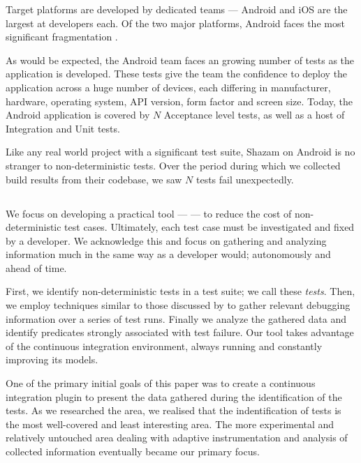 Target platforms are developed by dedicated teams --- Android and iOS are the largest at  developers each. Of the two major platforms, Android faces the most significant fragmentation \cite{AndroidFragmentationVisualized}.

As would be expected, the Android team faces an growing number of tests as the application is developed.  These tests give the team the confidence to deploy the application across a huge number of devices, each differing in manufacturer, hardware, operating system, API version, form factor and screen size. Today, the Android application is covered by $N$  Acceptance level tests, as well as a host of Integration and Unit tests.

Like any real world project with a significant test suite, Shazam on Android is no stranger to non-deterministic tests. Over the period  during which we collected build results from their codebase, we saw $N$ tests fail unexpectedly.

\subsection{\splatter}

We focus on developing a practical tool --- \emph{\splatter} --- to reduce the cost of non-deterministic test cases. Ultimately, each test case must be investigated and fixed by a developer. We acknowledge this and focus on gathering and analyzing information much in the same way as a developer would; autonomously and ahead of time.

First, we identify non-deterministic tests in a test suite; we call these \textit{\flaky tests}. Then, we employ techniques similar to those discussed by \citet{ArumugaNainar:2010:ABI:1806799.1806839} to gather relevant debugging information over a series of test runs. Finally we analyze the gathered data and identify predicates strongly associated with test failure. Our tool takes advantage of the continuous integration environment, always running and constantly improving its models.

One of the primary initial goals of this paper was to create a continuous integration plugin to present the data gathered during the identification of the \flaky tests. As we researched the area, we realised that the indentification of \flaky tests is the most well-covered and least interesting area. The more experimental and relatively untouched area dealing with adaptive instrumentation and analysis of collected information eventually became our primary focus.

